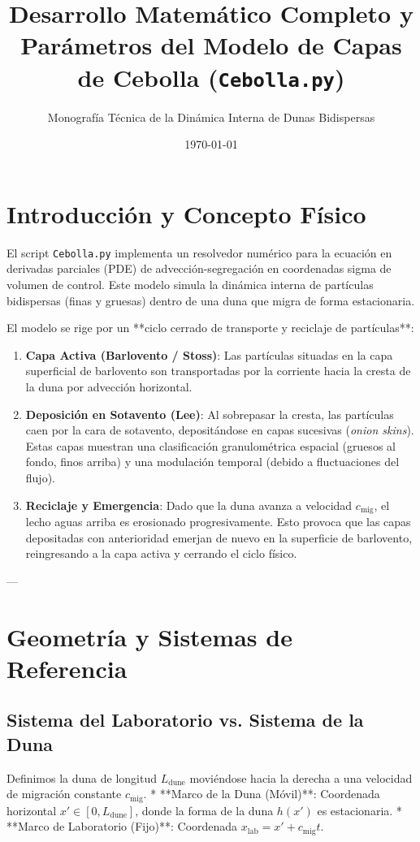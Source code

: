 \documentclass[11pt,a4paper]{article}
\title{\textbf{Desarrollo Matemático Completo y Parámetros del Modelo de Capas de Cebolla (\texttt{Cebolla.py})}}
\author{Monografía Técnica de la Dinámica Interna de Dunas Bidispersas}
\date{\today}
\begin{document}
\maketitle

\tableofcontents
\newpage

\section{Introducción y Concepto Físico}
El script \texttt{Cebolla.py} implementa un resolvedor numérico para la ecuación en derivadas parciales (PDE) de advección-segregación en coordenadas sigma de volumen de control. Este modelo simula la dinámica interna de partículas bidispersas (finas y gruesas) dentro de una duna que migra de forma estacionaria.

El modelo se rige por un **ciclo cerrado de transporte y reciclaje de partículas**:
\begin{enumerate}
    \item \textbf{Capa Activa (Barlovento / Stoss)}: Las partículas situadas en la capa superficial de barlovento son transportadas por la corriente hacia la cresta de la duna por advección horizontal.
    \item \textbf{Deposición en Sotavento (Lee)}: Al sobrepasar la cresta, las partículas caen por la cara de sotavento, depositándose en capas sucesivas (\emph{onion skins}). Estas capas muestran una clasificación granulométrica espacial (gruesos al fondo, finos arriba) y una modulación temporal (debido a fluctuaciones del flujo).
    \item \textbf{Reciclaje y Emergencia}: Dado que la duna avanza a velocidad $c_{\text{mig}}$, el lecho aguas arriba es erosionado progresivamente. Esto provoca que las capas depositadas con anterioridad emerjan de nuevo en la superficie de barlovento, reingresando a la capa activa y cerrando el ciclo físico.
\end{enumerate}

---

\section{Geometría y Sistemas de Referencia}

\subsection{Sistema del Laboratorio vs. Sistema de la Duna}
Definimos la duna de longitud $L_{\text{dune}}$ moviéndose hacia la derecha a una velocidad de migración constante $c_{\text{mig}}$.
* **Marco de la Duna (Móvil)**: Coordenada horizontal $x' \in [0, L_{\text{dune}}]$, donde la forma de la duna $h(x')$ es estacionaria.
* **Marco de Laboratorio (Fijo)**: Coordenada $x_{\text{lab}} = x' + c_{\text{mig}} t$.
\end{document}
